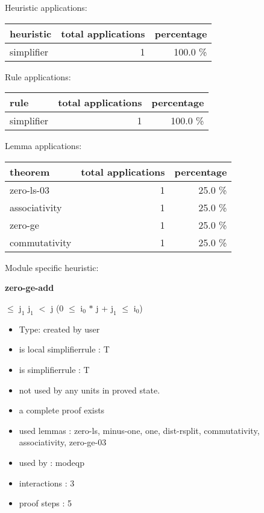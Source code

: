 \documentclass[a4paper]{article}
\begin{document}
\medskip


Heuristic applications:

\begin{supertabular}{l|r|r}
heuristic	& total applications & percentage \\ \hline
simplifier & 1 & 100.0 \% \\

\end{supertabular}

Rule applications:

\begin{supertabular}{l|r|r}
rule	        & total applications & percentage \\ \hline
simplifier & 1 & 100.0 \% \\

\end{supertabular}

Lemma applications:

\begin{supertabular}{l|r|r}
theorem	        & total applications & percentage \\ \hline
zero-ls-03 & 1 & 25.0 \% \\
associativity & 1 & 25.0 \% \\
zero-ge & 1 & 25.0 \% \\
commutativity & 1 & 25.0 \% \\

\end{supertabular}

Module specific heuristic:

\pagebreak

{\LARGE\bf zero-ge-add}\label{lemma-zero-ge-add}

\medskip

  $\le$ $\mbox{j}_{1}$ \And $\mbox{j}_{1}$ $<$ j \Imp (0 $\le$ $\mbox{i}_{0}$ $*$ j + $\mbox{j}_{1}$  $\le$ $\mbox{i}_{0}$)

\begin{itemize}

\item Type: created by user

\item is local simplifierrule : T
\item is simplifierrule : T
\item not used by any units in proved state.
\item       a complete proof exists
\item       used lemmas  : zero-ls, minus-one, one, dist-rsplit, commutativity, associativity, zero-ge-03
\item       used by      : modeqp
\item       interactions : 3
\item       proof steps  : 5
\end{itemize}
\end{document}
